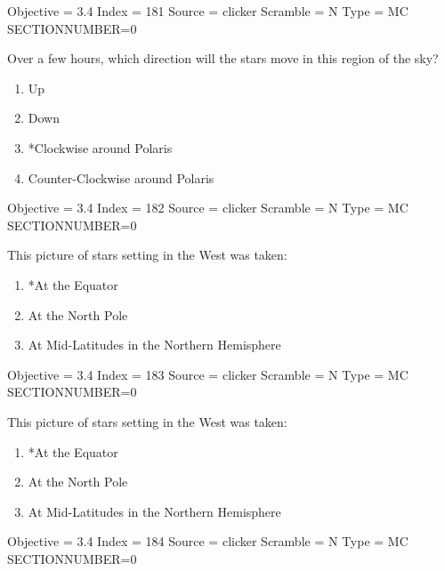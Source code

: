 \documentclass[11pt]{article}
\begin{document}
\begin{enumerate}
\begin{minipage}{\textwidth}
\begin{minipage}{\textwidth}
Objective = 3.4
Index = 181
Source = clicker
Scramble = N
Type = MC
SECTIONNUMBER=0
\end{minipage}
\end{minipage}
\vskip 0.20in

\begin{minipage}{\textwidth}
\begin{minipage}{\textwidth}
\item Over a few hours, which direction will the stars move in this region of the sky?
\begin{multicols}{2}
\begin{enumerate} 
\setlength{\itemsep}{1pt} 
\setlength{\parskip}{0pt} 
\setlength{\parsep}{0pt}
\setlength{\multicolsep}{1pt} 
\item Up
\item Down
\item *Clockwise around Polaris
\item Counter-Clockwise around Polaris
\end{enumerate} 
\vfill 
\end{multicols}

Objective = 3.4
Index = 182
Source = clicker
Scramble = N
Type = MC
SECTIONNUMBER=0
\end{minipage}
\end{minipage}
\vskip 0.20in

\begin{minipage}{\textwidth}
\begin{minipage}{\textwidth}
\item This picture of stars setting in the West was taken:
\begin{enumerate} 
\setlength{\itemsep}{1pt} 
\setlength{\parskip}{0pt} 
\setlength{\parsep}{0pt}
\setlength{\multicolsep}{1pt} 
\item *At the Equator
\item At the North Pole
\item At Mid-Latitudes in the Northern Hemisphere
\end{enumerate} 
Objective = 3.4
Index = 183
Source = clicker
Scramble = N
Type = MC
SECTIONNUMBER=0
\end{minipage}
\end{minipage}
\vskip 0.20in

\begin{minipage}{\textwidth}
\begin{minipage}{\textwidth}
\item This picture of stars setting in the West was taken:
\begin{enumerate} 
\setlength{\itemsep}{1pt} 
\setlength{\parskip}{0pt} 
\setlength{\parsep}{0pt}
\setlength{\multicolsep}{1pt} 
\item *At the Equator
\item At the North Pole
\item At Mid-Latitudes in the Northern Hemisphere
\end{enumerate} 
Objective = 3.4
Index = 184
Source = clicker
Scramble = N
Type = MC
SECTIONNUMBER=0
\end{minipage}
\end{minipage}
\vskip 0.20in


\end{enumerate}
\end{document}
